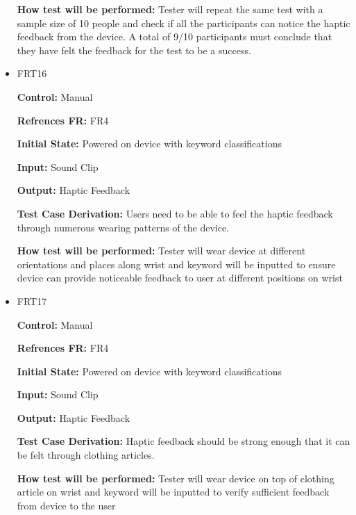 \documentclass[12pt, titlepage]{article}
\begin{document}
\begin{itemize}
\textbf{How test will be performed:} Tester will repeat the same test with a sample size of 10 people and check if all the participants can notice the haptic feedback from the device. A total of 9/10 participants must conclude that they have felt the feedback for the test to be a success.


\item{FRT16}

\textbf{Control:} Manual

\textbf{Refrences FR:} FR4 					

\textbf{Initial State:} Powered on device with keyword classifications
					
\textbf{Input:} Sound Clip
					
\textbf{Output:} Haptic Feedback

\textbf{Test Case Derivation:} Users need to be able to feel the haptic feedback through numerous wearing patterns of the device.
					
\textbf{How test will be performed:} Tester will wear device at different orientations and places along wrist and keyword will be inputted to ensure device can provide noticeable feedback to user at different positions on wrist


\item{FRT17}

\textbf{Control:} Manual

\textbf{Refrences FR:} FR4 					

\textbf{Initial State:} Powered on device with keyword classifications
					
\textbf{Input:} Sound Clip
					
\textbf{Output:} Haptic Feedback

\textbf{Test Case Derivation:} Haptic feedback should be strong enough that it can be felt through clothing articles.
					
\textbf{How test will be performed:} Tester will wear device on top of clothing article on wrist and keyword will be inputted to verify sufficient feedback from device to the user



\end{itemize}
\end{document}
